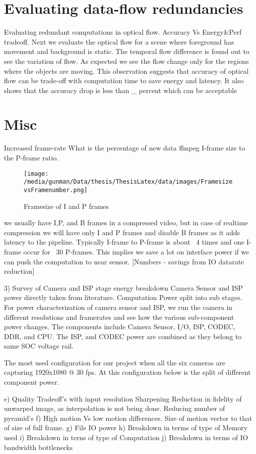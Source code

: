 \section{Evaluating data-flow redundancies}
Evaluating redundant computations in optical flow. 
Accuracy Vs Energy\&Perf tradeoff. 
Next we evaluate the optical flow for a scene where foreground has movement and background is static. The temporal flow difference is found out to see the variation of flow. As expected we see the flow change only for the regions where the objects are moving. This observation suggests that accuracy of optical flow can be trade-off with computation time to save energy and latency. It also shows that the accuracy drop is less than \_ percent which can be acceptable


\section{Misc}

	
Increased frame-rate\newline
What is the percentage of new data
ffmpeg I-frame size to the P-frame ratio.
\begin{figure*}
	\begin{center}
		\texttt{[image: /media/gunman/Data/thesis/ThesisLatex/data/images/FramesizevsFramenumber.png]}
		\caption{Framesize of I and P frames}
		\label{fig:ex_4_9}
	\end{center}
	\vspace{-0.3in}
\end{figure*} 
we usually have I,P, and B frames in a compressed video, but in case of realtime compression we will have only I and P frames and disable B frames as it adds latency to the pipeline. Typically I-frame to P-frame is about ~4 times and one I-frame occur for ~30 P-frames. This implies we save a lot on interface power if we can push the computation to near sensor.  
[Numbers - savings from IO datarate reduction]

3) Survey of Camera and ISP stage energy breakdown
Camera Sensor and ISP power directly taken from literature.
Computation Power split into sub stages. \newline
For power characterization of camera sensor and ISP, we run the camera in different resolutions and framerates and see how the various sub-component power changes. The components include Camera Sensor, I/O, ISP, CODEC, DDR, and CPU. The ISP, and CODEC power are combined as they belong to same SOC voltage rail.

The most used configuration for our project when all the six cameras are capturing 1920x1080 @ 30 fps. At this configuration below is the split of different component power. \newline


	e) Quality Tradeoff's with input resolution\newline
Sharpening
Reduction in fidelity of unwarped image, as interpolation is not being done.
Reducing number of pyramid's
f) High motion Vs low motion differences. Size of motion vector to that of size of full frame. 
g) File IO power
h) Breakdown in terms of type of Memory	used
i) Breakdown in terns of type of Computation
j) Breakdown in terms of IO bandwidth bottlenecks
